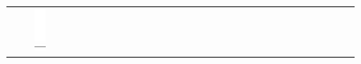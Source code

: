 \documentclass[10pt]{article}
\begin{document}
\begin{center}
\begin{tabular}{|c|c|c|c|c|c|c|c|c|c|c|c|c|c|c|c|c|c|c|c|c|c|c|c|c|c|c|c|c|c|}
 &  & \includegraphics[max width=\textwidth]{2024_11_21_e15da647cf0a41077ac3g-10(3)}

\end{tabular}
\end{center}
\end{document}
